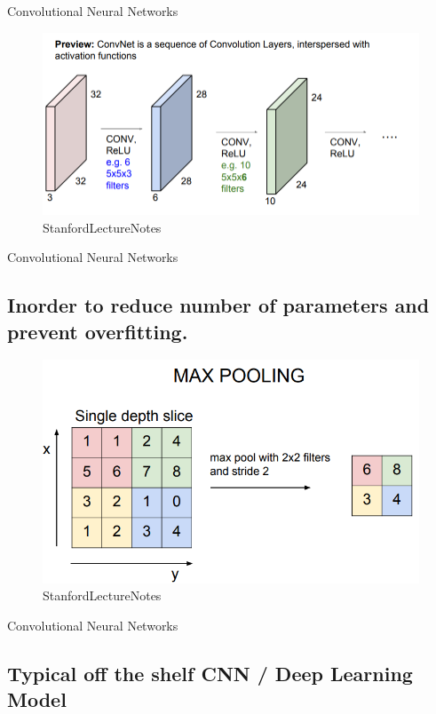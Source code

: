 \documentclass[11pt]{article}
\makeatletter
\def\maxwidth{\ifdim\Gin@nat@width>\linewidth\linewidth
    \else\Gin@nat@width\fi}
\let\Oldincludegraphics\includegraphics
\renewcommand{\includegraphics}[1]{\Oldincludegraphics[width=.8\maxwidth]{#1}}
\makeatother
\begin{document}
    Convolutional Neural Networks

\begin{figure}
\centering
\includegraphics{pres_imgs/conv_net_full.png}
\caption{StanfordLectureNotes}
\end{figure}

    Convolutional Neural Networks

\hypertarget{inorder-to-reduce-number-of-parameters-and-prevent-overfitting.}{%
\subsection{Inorder to reduce number of parameters and prevent
overfitting.}\label{inorder-to-reduce-number-of-parameters-and-prevent-overfitting.}}

\begin{figure}
\centering
\includegraphics{pres_imgs/pooling.png}
\caption{StanfordLectureNotes}
\end{figure}

    Convolutional Neural Networks

\hypertarget{typical-off-the-shelf-cnn-deep-learning-model}{%
\subsection{Typical off the shelf CNN / Deep Learning
Model}\label{typical-off-the-shelf-cnn-deep-learning-model}}
\end{document}
